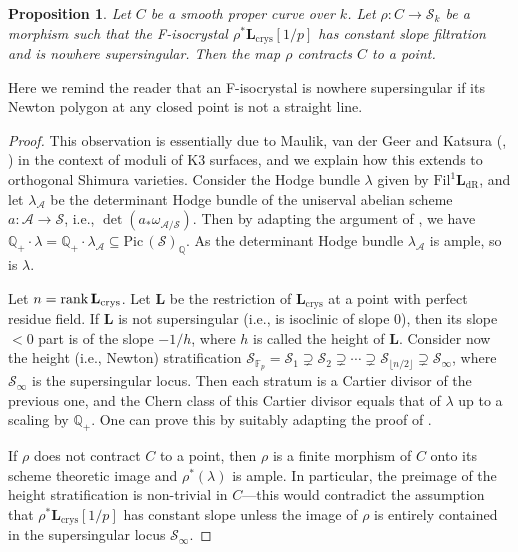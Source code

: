 \documentclass[11pt, letterpaper]{amsart}
\theoremstyle{plain}
\newtheorem{proposition}[theorem]{Proposition}
\theoremstyle{definition}
\newcommand{\IF}{\mathbb{F}}
\newcommand{\IQ}{\mathbb{Q}}
\newcommand{\rank}{\rm rank}
\newcommand{\<}{\langle}
\renewcommand{\>}{\rangle}
\newcommand{\Pic}{\mathrm{Pic}\,}
\newcommand{\shS}{\mathscr{S}}
\newcommand{\sA}{\mathcal{A}}
\newcommand{\bL}{\mathbf{L}}
\newcommand{\crys}{\mathrm{crys}}
\newcommand{\dR}{\mathrm{dR}}
\newcommand{\Fil}{\mathrm{Fil}}
\begin{document}
\begin{proposition}
\label{prop: height jump}
    Let $C$ be a smooth \emph{proper} curve over $k$. 
    Let $\rho : C \to \shS_k$ be a morphism such that the F-isocrystal $\rho^* \bL_\crys[1/p]$ has constant slope filtration and is nowhere supersingular. Then the map $\rho$ contracts $C$ to a point. 
\end{proposition}
Here we remind the reader that an F-isocrystal is nowhere supersingular if its Newton polygon at any closed point is not a straight line.
\begin{proof}
    This observation is essentially due to Maulik, van der Geer and Katsura (\cite[Cor.~5.5]{Maulik}, \cite[Thm.~15.3]{vdGK}) in the context of moduli of K3 surfaces,
    and we explain how this extends to orthogonal Shimura varieties. 
    Consider the Hodge bundle $\lambda$ given by $\Fil^1 \bL_\dR$, and let $\lambda_\sA$ be the determinant Hodge bundle of the uniserval abelian scheme $a : \sA \to \shS$, i.e., $\det(a_* \omega_{\sA / \shS})$. 
    Then by adapting the argument of \cite[Prop.~5.8]{Maulik}, we have $\IQ_+ \cdot \lambda = \IQ_+ \cdot \lambda_\sA \subseteq \Pic(\shS)_\IQ$. 
    As the determinant Hodge bundle $\lambda_\sA$ is ample, so is $\lambda$. 

    Let $n = \rank \, \bL_\crys$. 
    Let $\bL$ be the restriction of $\bL_\crys$ at a point with perfect residue field. 
    If $\bL$ is not supersingular (i.e., is isoclinic of slope $0$), then its slope $< 0$ part is of the slope $-1/h$, where $h$ is called the height of $\bL$. 
    Consider now the height (i.e., Newton) stratification $\shS_{\IF_p} = \shS_1 \supsetneq \shS_{2} \supsetneq \cdots \supsetneq \shS_{\lfloor n / 2 \rfloor} \supsetneq \shS_\infty$, where $\shS_\infty$ is the supersingular locus.  
    Then each stratum is a Cartier divisor of the previous one, and the Chern class of this Cartier divisor equals that of $\lambda$ up to a scaling by $\IQ_+$. 
    One can prove this by suitably adapting the proof of \cite[Thm.~15.1]{vdGK}. 
    
    If $\rho$ does not contract $C$ to a point, then $\rho$ is a finite morphism of $C$ onto its scheme theoretic image and $\rho^*(\lambda)$ is ample.
    In particular, the preimage of the height stratification is non-trivial in $C$---this would contradict the assumption that $\rho^* \bL_\crys[1/p]$ has constant slope unless the image of $\rho$ is entirely contained in the supersingular locus $\shS_\infty$. 
\end{proof}
\end{document}
